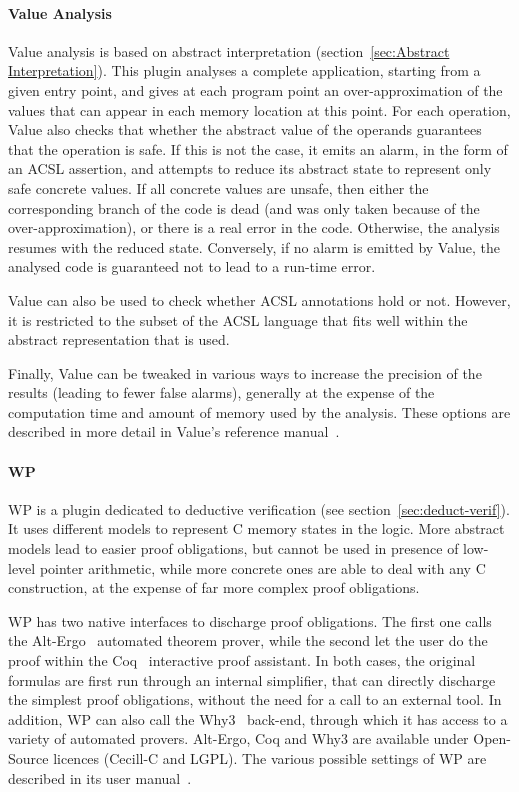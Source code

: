 \documentclass{template/openetcs_report}
\begin{document}
\paragraph{Value Analysis} 
Value analysis is based on abstract interpretation 
(section~\ref{sec:Abstract Interpretation}). This plugin analyses a
complete application, starting from a given entry point, and gives at
each program point an over-approximation of the values that can appear
in each memory location at this point. For each operation, Value also
checks that whether the abstract value of the operands guarantees that
the operation is safe. If this is not the case, it emits an alarm, in
the form of an ACSL assertion, and attempts to reduce its abstract
state to represent only safe concrete values. If all concrete values
are unsafe, then either the corresponding branch of the code is dead
(and was only taken because of the over-approximation), or there is a
real error in the code. Otherwise, the analysis resumes with the
reduced state. Conversely, if no alarm is emitted by Value, the
analysed code is guaranteed not to lead to a run-time error.

Value can also be used to check whether ACSL annotations hold or
not. However, it is restricted to the subset of the ACSL language that
fits well within the abstract representation that is used.

Finally, Value can be tweaked in various ways to increase the
precision of the results (leading to fewer false alarms), generally at
the expense of the computation time and amount of memory used by the
analysis. These options are described in more detail in Value's
reference manual~\cite{frama-c-va}.

\paragraph{WP} 
WP is a plugin dedicated to deductive verification 
(see section~\ref{sec:deduct-verif}). It uses different models 
to represent C memory states in the logic. More abstract models lead to easier
proof obligations, but cannot be used in presence of low-level pointer 
arithmetic, while more concrete ones are able to deal with any C construction,
at the expense of far more complex proof obligations.

WP has two native interfaces to discharge proof obligations. The first one calls
the Alt-Ergo~\cite{alt-ergo} automated theorem prover, while the second let the
user do the proof within the Coq~\cite{coq} interactive proof assistant. In
both cases, the original formulas are first run through an internal simplifier,
that can directly discharge the simplest proof obligations, without the need
for a call to an external tool. In addition, WP can also call the
Why3~\cite{why3} back-end, through which it has access to a
variety of automated provers. Alt-Ergo, Coq and Why3 are available
under Open-Source licences (Cecill-C and LGPL). The various possible settings
of WP are described in its user manual~\cite{WP}.
\end{document}
